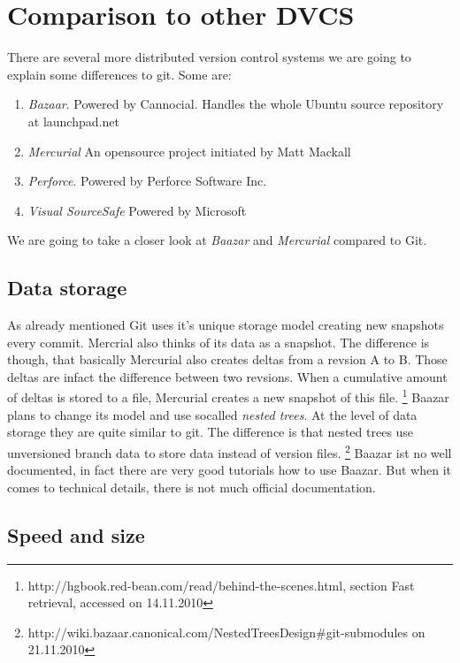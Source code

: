 \section {Comparison to other DVCS}

There are several more distributed version control systems
we are going to explain some differences to git.
Some are:

  \begin{enumerate}
     \item \emph{Bazaar}. Powered by Cannocial. Handles the whole Ubuntu source
     repository at launchpad.net
     \item \emph{Mercurial} An opensource project initiated by Matt Mackall
     \item \emph{Perforce}. Powered by Perforce Software Inc.
     \item \emph{Visual SourceSafe} Powered by Microsoft
  \end{enumerate}
  
We are going to take a closer look at \emph{Baazar} and \emph{Mercurial} 
compared to Git.

\subsection {Data storage}

As already mentioned Git uses it's unique storage model creating new snapshots
every commit. Mercrial also thinks of its data as a snapshot. The difference
is though, that basically Mercurial also creates deltas from a revsion A to B.
Those deltas are infact the difference between two revsions. When a cumulative
amount of deltas is stored to a file, Mercurial creates a new snapshot of this file. 
\footnote{\cite {hgbook2009}
http://hgbook.red-bean.com/read/behind-the-scenes.html, section Fast retrieval,
accessed on 14.11.2010}
Baazar plans to change its model and use socalled \emph{nested trees}. At the level of data storage they are quite similar to git. The difference is that nested trees use unversioned branch data to store data instead of version files. \footnote{ http://wiki.bazaar.canonical.com/NestedTreesDesign\#git-submodules on 21.11.2010 } Baazar ist no well documented, in fact there are very good tutorials how to use Baazar. But when it comes to technical details, there is not much official documentation.

\subsection {Speed and size}

